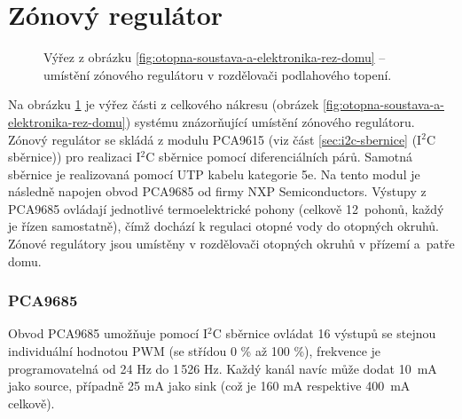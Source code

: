 \section{Zónový regulátor}
\begin{figure}[H]
   \centering
    \def\svgwidth{0.5\columnwidth}
   
    \caption[Výřez pro umístění zónového regulátoru v rozdělovači podlahového topení.]{Výřez z obrázku \ref{fig:otopna-soustava-a-elektronika-rez-domu} – umístění zónového regulátoru v rozdělovači podlahového topení.}
    \label{fig:vyrez-zonovy-regulator}
\end{figure}
Na obrázku \ref{fig:vyrez-zonovy-regulator} je výřez části z celkového nákresu (obrázek \ref{fig:otopna-soustava-a-elektronika-rez-domu}) systému znázorňující umístění zónového regulátoru. Zónový regulátor se skládá z modulu PCA9615 (viz část  \ref{sec:i2c-sbernice} (I$^2$C sběrnice)) pro realizaci I$^2$C sběrnice pomocí diferenciálních párů. Samotná sběrnice je realizovaná pomocí UTP kabelu kategorie 5e. Na tento modul je následně napojen obvod PCA9685 \cite{pca9685} od firmy NXP Semiconductors. Výstupy z PCA9685 ovládají jednotlivé termoelektrické pohony (celkově 12~pohonů, každý je řízen samostatně), čímž dochází k regulaci otopné vody do otopných okruhů. Zónové regulátory jsou umístěny v rozdělovači otopných okruhů v přízemí a~patře domu.

\subsubsection{PCA9685}
Obvod PCA9685 umožňuje pomocí I$^2$C sběrnice ovládat 16 výstupů se stejnou individuální hodnotou PWM (se střídou 0 \% až 100 \%), frekvence je programovatelná od 24 Hz do 1\,526 Hz. Každý kanál navíc může dodat 10~mA jako source, případně 25 mA jako sink (což je 160 mA respektive 400~mA celkově).


